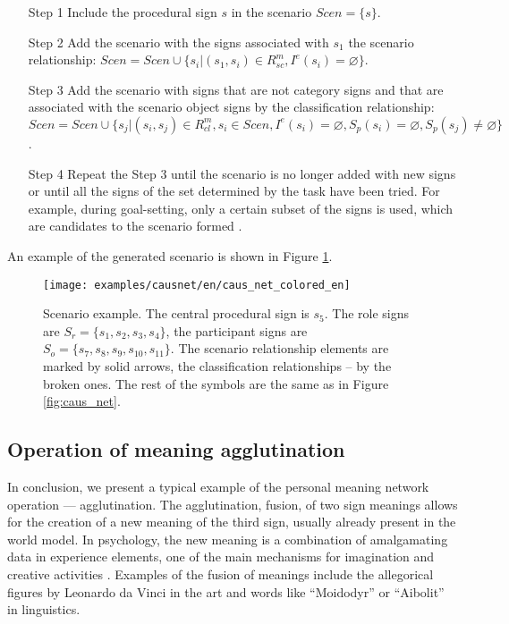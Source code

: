 \documentclass[12pt]{scrartcl}
\begin{document}
	\begin{itemize}
		\item [Step 1] Include the procedural sign $s$ in the scenario $Scen=\{s\}$.
		\item [Step 2] Add the scenario with the signs associated with $s_1$ the scenario relationship: $Scen=Scen\cup\{s_i|(s_1,s_i)\in R_{sc}^m, I^e(s_i)=\varnothing\}$.
		\item [Step 3] Add the scenario with signs that are not category signs and that are associated with the scenario object signs by the classification relationship: $Scen=Scen\cup\{s_j|(s_i,s_j)\in R_{cl}^m, s_i\in Scen, I^e(s_i)=\varnothing, S_p(s_i)=\varnothing, S_p(s_j)\not=\varnothing\}$.
		\item [Step 4] Repeat the Step 3 until the scenario is no longer added with new signs or until all the signs of the set determined by the task have been tried. For example, during goal-setting, only a certain subset of the signs is used, which are candidates to the scenario formed \cite{Osipov2014c}.
	\end{itemize}
	
	An example of the generated scenario is shown in Figure \ref{fig:scenarion}.
	
	\begin{figure}[h]
		\centering
		\texttt{[image: examples/causnet/en/caus\_net\_colored\_en]}
		\caption{Scenario example. The central procedural sign is $s_5$. The role signs are $S_r=\{s_1,s_2,s_3,s_4\}$, the participant signs are $S_o=\{s_7,s_8,s_9,s_{10},s_{11}\}$. The scenario relationship elements are marked by solid arrows, the classification relationships – by the broken ones. The rest of the symbols are the same as in Figure \ref{fig:caus_net}.}
		\label{fig:scenarion}		
	\end{figure}

		
	\subsection{Operation of meaning agglutination}
	In conclusion, we present a typical example of the personal meaning network operation --- agglutination. The agglutination, fusion, of two sign meanings allows for the creation of a new meaning of the third sign, usually already present in the world model. In psychology, the new meaning is a combination of amalgamating data in experience elements, one of the main mechanisms for imagination and creative activities \cite{Asmolov1990}. Examples of the fusion of meanings include the allegorical figures by Leonardo da Vinci in the art and words like ``Moidodyr'' or ``Aibolit'' in linguistics.
	
\end{document}

